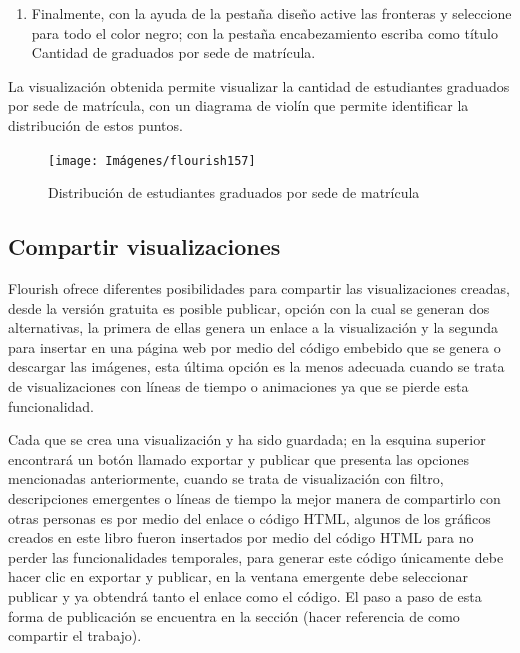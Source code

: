 \documentclass[
]{book}
\providecommand{\tightlist}{%
  \setlength{\itemsep}{0pt}\setlength{\parskip}{0pt}}
\begin{document}
\begin{enumerate}
\def\labelenumi{\arabic{enumi}.}
\setcounter{enumi}{10}
\tightlist
\item
  Finalmente, con la ayuda de la pestaña diseño active las fronteras y seleccione para todo el color negro; con la pestaña encabezamiento escriba como título Cantidad de graduados por sede de matrícula.
\end{enumerate}

La visualización obtenida permite visualizar la cantidad de estudiantes graduados por sede de matrícula, con un diagrama de violín que permite identificar la distribución de estos puntos.

\begin{figure}

{\centering \texttt{[image: Imágenes/flourish157]} 

}

\caption{Distribución de estudiantes graduados por sede de matrícula}\label{fig:finalpuntosflourish-fig}
\end{figure}

\hypertarget{compartir-visualizaciones}{%
\subsection{Compartir visualizaciones}\label{compartir-visualizaciones}}

Flourish ofrece diferentes posibilidades para compartir las visualizaciones creadas, desde la versión gratuita es posible publicar, opción con la cual se generan dos alternativas, la primera de ellas genera un enlace a la visualización y la segunda para insertar en una página web por medio del código embebido que se genera o descargar las imágenes, esta última opción es la menos adecuada cuando se trata de visualizaciones con líneas de tiempo o animaciones ya que se pierde esta funcionalidad.

Cada que se crea una visualización y ha sido guardada; en la esquina superior encontrará un botón llamado exportar y publicar que presenta las opciones mencionadas anteriormente, cuando se trata de visualización con filtro, descripciones emergentes o líneas de tiempo la mejor manera de compartirlo con otras personas es por medio del enlace o código HTML, algunos de los gráficos creados en este libro fueron insertados por medio del código HTML para no perder las funcionalidades temporales, para generar este código únicamente debe hacer clic en exportar y publicar, en la ventana emergente debe seleccionar publicar y ya obtendrá tanto el enlace como el código. El paso a paso de esta forma de publicación se encuentra en la sección (hacer referencia de como compartir el trabajo).
\end{document}

